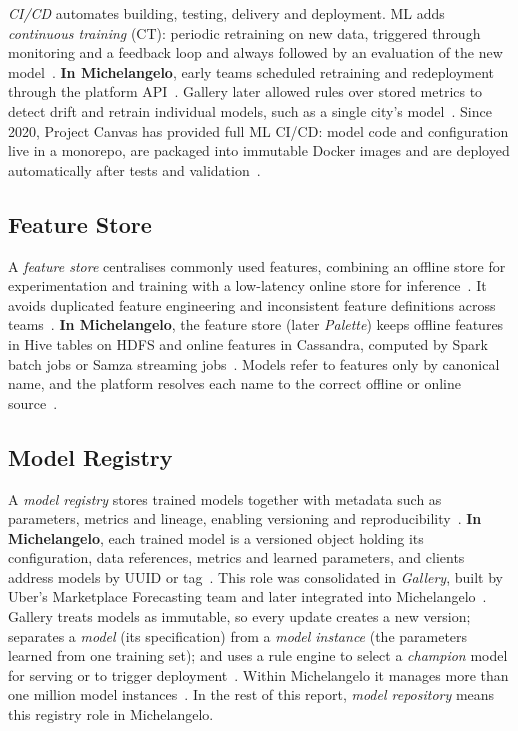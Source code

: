 \emph{CI/CD} automates building, testing, delivery and deployment.
ML adds \emph{continuous training} (CT): periodic retraining on new data,
triggered through monitoring and a feedback loop and always followed by
an evaluation of the new model~\cite{kreuzberger2023mlops}.
\textbf{In Michelangelo}, early teams scheduled retraining and
redeployment through the platform API~\cite{delbalso2017meet}. Gallery
later allowed rules over stored metrics to detect drift and retrain
individual models, such as a single city's
model~\cite{sun2020gallery}. Since 2020, Project Canvas has provided
full ML CI/CD: model code and configuration live in a monorepo, are
packaged into immutable Docker images and are deployed automatically
after tests and validation~\cite{wang2024predictive}.

\subsection{Feature Store}
\label{subsec:feature-store}

A \emph{feature store} centralises commonly used features, combining an
offline store for experimentation and training with a low-latency online
store for inference~\cite{kreuzberger2023mlops}. It avoids duplicated
feature engineering and inconsistent feature definitions across
teams~\cite{orr2021managing}.
\textbf{In Michelangelo}, the feature store (later \emph{Palette}) keeps
offline features in Hive tables on HDFS and online features in Cassandra, computed by
Spark batch jobs or Samza streaming jobs~\cite{li2017scaling}. Models
refer to features only by canonical name, and the platform resolves each
name to the correct offline or online source~\cite{delbalso2017meet}.

\subsection{Model Registry}
\label{subsec:model-registry}

A \emph{model registry} stores trained models together with metadata
such as parameters, metrics and lineage, enabling versioning and
reproducibility~\cite{kreuzberger2023mlops}.
\textbf{In Michelangelo}, each trained model is a versioned object
holding its configuration, data references, metrics and learned
parameters, and clients address models by UUID or
tag~\cite{delbalso2017meet}. This role was consolidated in
\emph{Gallery}, built by Uber's Marketplace Forecasting team and later
integrated into Michelangelo~\cite{sun2020gallery}. Gallery treats models
as immutable, so every update creates a new version; separates a
\emph{model} (its specification) from a \emph{model instance} (the
parameters learned from one training set); and uses a rule engine to
select a \emph{champion} model for serving or to trigger
deployment~\cite{sun2020gallery}. Within Michelangelo it manages more
than one million model instances~\cite{sun2020gallery}. In the rest of this
report, \emph{model repository} means this registry role in Michelangelo.

